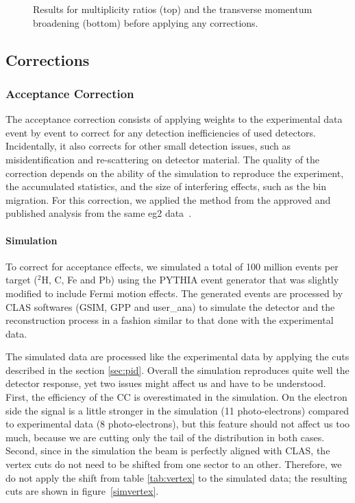 \begin{figure}[htb]
\caption {Results for multiplicity ratios (top) and the transverse momentum 
broadening (bottom) before applying any corrections.}
\label{fig:prelim}
\end{figure}


\subsection{Corrections}
\label{sec:corrections}

\subsubsection{Acceptance Correction}
\label{sec:accept}

The acceptance correction consists of applying weights to the experimental data
event by event to correct for any detection inefficiencies of used detectors.
Incidentally, it also corrects for other small detection issues, such as 
misidentification and re-scattering on detector material. The quality 
of the correction depends on the ability of the simulation to reproduce the 
experiment, the accumulated statistics, and the size of interfering effects, such 
as the bin migration. For this correction, we applied the method from the 
approved and published analysis from the same eg2 data~\cite{ElFassi:2008}.

\paragraph{Simulation}
\label{sec:simul}

To correct for acceptance effects, we simulated a total of 100 million events 
per target ($^2$H, C, Fe and Pb) using the PYTHIA \cite{Sjostrand:2006za} 
event generator that was slightly modified to include Fermi motion effects. The 
generated events are processed by CLAS softwares (GSIM, GPP and user\_ana) 
to simulate the detector and the reconstruction process in a fashion similar 
to that done with the experimental data.

The simulated data are processed like the experimental data by 
applying the cuts described in the section \ref{sec:pid}. Overall the 
simulation reproduces quite well the detector response, yet two issues might 
affect us and have to be understood. First, the efficiency of the CC is 
overestimated in the simulation. On the electron side the signal is a little stronger in the simulation (11 
photo-electrons) compared to experimental data (8 photo-electrons), but this 
feature should not affect us too much, because we are cutting only the tail of the 
distribution in both cases. Second, since in the simulation the beam is perfectly aligned with CLAS, the vertex cuts do not need to be shifted from one sector to an other. Therefore, we do not apply the shift from table \ref{tab:vertex} to the simulated data; the resulting cuts are shown in figure~\ref{simvertex}.

